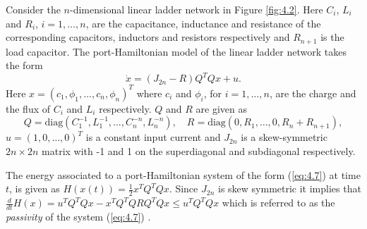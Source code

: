 Consider the $n$-dimensional linear ladder network in Figure \ref{fig:4.2}. Here $C_i$, $L_i$ and $R_i$, $i=1,\dots,n$, are the capacitance, inductance and resistance of the corresponding capacitors, inductors and resistors respectively and $R_{n+1}$ is the load capacitor. The port-Hamiltonian model of the linear ladder network takes the form
\begin{equation} \label{eq:4.7}
		\dot x = (J_{2n} - R)Q^TQx + u.
\end{equation}
Here $x = (c_1,\phi_1,\dots,c_n,\phi_n)^T$ where $c_i$ and $\phi_i$, for $i=1,\dots,n$, are the charge and the flux of $C_i$ and $L_i$ respectively. $Q$ and $R$ are given as
\begin{equation}
	Q = \text{diag}(C_1^{-1},L_1^{-1},\dots,C_n^{-n},L_n^{-n}), \quad R = \text{diag}(0,R_1,\dots,0,R_n+R_{n+1}),
\end{equation}
$u=(1,0,\dots,0)^T$ is a constant input current and $J_{2n}$ is a skew-symmetric $2n\times 2n$ matrix with -1 and 1 on the superdiagonal and subdiagonal respectively. 

The energy associated to a port-Hamiltonian system of the form (\ref{eq:4.7}) at time $t$, is given as $H(x(t)) = \frac 1 2 x^T Q^T Q x$. Since $J_{2n}$ is skew symmetric it implies that $\frac d {dt} H(x) = u^T Q^T Q x - x^T Q^T Q R Q^T Q x \leq u^T Q^T Q x$ which is referred to as the \emph{passivity} of the system (\ref{eq:4.7}) \cite{vanderSchaft:1996es,Willems:1972ek}.

